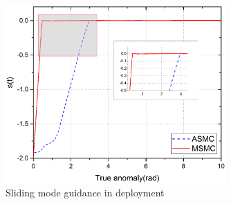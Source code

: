\documentclass[3p]{elsarticle}
\theoremstyle{plain}
\begin{document}
\begin{figure}
\centering
\includegraphics[width=0.75\textwidth]{deployment_s(t).eps}
\caption{Sliding mode guidance in deployment}
\label{fig:switch}
\end{figure}
\end{document}
